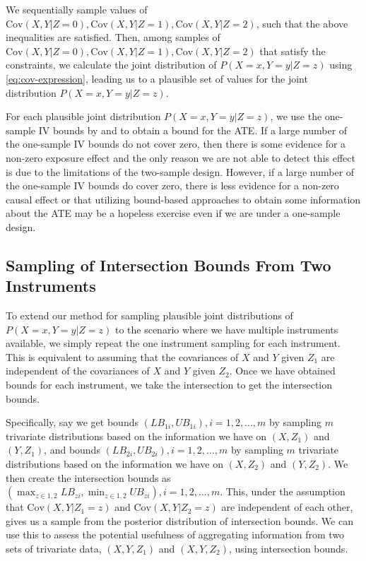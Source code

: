 \documentclass[AMA,STIX1COL,]{WileyNJD-v2}
\begin{document}
We sequentially sample values of
\(\text{Cov}(X, Y | Z = 0), \text{Cov}(X, Y | Z = 1), \text{Cov}(X, Y | Z = 2)\),
such that the above inequalities are satisfied. Then, among samples of
\(\text{Cov}(X, Y | Z = 0), \text{Cov}(X, Y | Z = 1), \text{Cov}(X, Y | Z = 2)\)
that satisfy the constraints, we calculate the joint distribution of
\(P(X = x, Y = y | Z = z)\) using \eqref{eq:cov-expression}, leading us
to a plausible set of values for the joint distribution
\(P(X = x, Y = y | Z = z)\).

For each plausible joint distribution \(P(X = x, Y = y | Z = z)\), we
use the one-sample IV bounds by \citep{balke_bounds_1997} and
\citep{richardson_ace_2014} to obtain a bound for the ATE. If a large
number of the one-sample IV bounds do not cover zero, then there is some
evidence for a non-zero exposure effect and the only reason we are not
able to detect this effect is due to the limitations of the two-sample
design. However, if a large number of the one-sample IV bounds do cover
zero, there is less evidence for a non-zero causal effect or that
utilizing bound-based approaches to obtain some information about the
ATE may be a hopeless exercise even if we are under a one-sample design.

\hypertarget{sampling-of-intersection-bounds-from-two-instruments}{%
\subsection{Sampling of Intersection Bounds From Two
Instruments}\label{sampling-of-intersection-bounds-from-two-instruments}}

\label{sample-intersection-bounds}

To extend our method for sampling plausible joint distributions of
\(P(X = x, Y = y | Z = z)\) to the scenario where we have multiple
instruments available, we simply repeat the one instrument sampling for
each instrument. This is equivalent to assuming that the covariances of
\(X\) and \(Y\) given \(Z_1\) are independent of the covariances of
\(X\) and \(Y\) given \(Z_2\). Once we have obtained bounds for each
instrument, we take the intersection to get the intersection bounds.

Specifically, say we get bounds \((LB_{1i},UB_{1i}),i = 1,2,...,m\) by
sampling \(m\) trivariate distributions based on the information we have
on \((X,Z_1)\) and \((Y,Z_1)\), and bounds
\((LB_{2i}, UB_{2i}),i = 1,2,...,m\) by sampling \(m\) trivariate
distributions based on the information we have on \((X,Z_2)\) and
\((Y,Z_2)\). We then create the intersection bounds as
\(\left(\max_{z \in {1,2}} LB_{zi}, \min_{z \in {1,2}} UB_{zi}\right), i = 1, 2, ..., m\).
This, under the assumption that \(\text{Cov}(X, Y | Z_1 = z)\) and
\(\text{Cov}(X, Y | Z_2 = z)\) are independent of each other, gives us a
sample from the posterior distribution of intersection bounds. We can
use this to assess the potential usefulness of aggregating information
from two sets of trivariate data, \((X, Y, Z_1)\) and \((X, Y, Z_2)\),
using intersection bounds.
\end{document}
